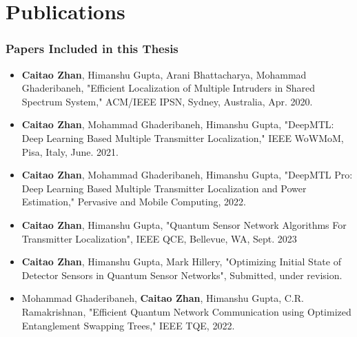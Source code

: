 \chapter{Publications}

\subsection*{Papers Included in this Thesis}
\begin{itemize}
    \item \textbf{Caitao Zhan}, Himanshu Gupta, Arani Bhattacharya, Mohammad Ghaderibaneh, "Efficient Localization of Multiple Intruders in Shared Spectrum System," ACM/IEEE IPSN, Sydney, Australia, Apr. 2020.

    \item \textbf{Caitao Zhan}, Mohammad Ghaderibaneh, Himanshu Gupta, "DeepMTL: Deep Learning Based Multiple Transmitter Localization," IEEE WoWMoM, Pisa, Italy, June. 2021. 

    \item \textbf{Caitao Zhan}, Mohammad Ghaderibaneh, Himanshu Gupta, "DeepMTL Pro: Deep Learning Based Multiple Transmitter Localization and Power Estimation," Pervasive and Mobile Computing, 2022.

    \item \textbf{Caitao Zhan}, Himanshu Gupta, "Quantum Sensor Network Algorithms For Transmitter Localization", IEEE QCE, Bellevue, WA, Sept. 2023
    
    \item \textbf{Caitao Zhan}, Himanshu Gupta, Mark Hillery, "Optimizing Initial State of Detector Sensors in Quantum Sensor Networks", Submitted, under revision.

    \item Mohammad Ghaderibaneh, \textbf{Caitao Zhan}, Himanshu Gupta, C.R. Ramakrishnan, "Efficient Quantum Network Communication using Optimized Entanglement Swapping Trees," IEEE TQE, 2022.


\end{itemize}

